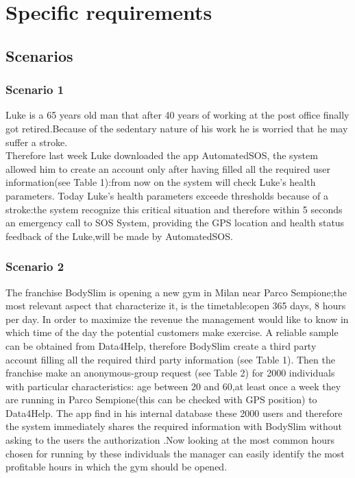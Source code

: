 \section{Specific requirements}
\label{sec:specreq}
\subsection{Scenarios}
\subsubsection{Scenario 1}
Luke is a 65 years old man that after 40 years of  working at the post office finally got retired.Because of the sedentary nature of his work he is worried that he may suffer a stroke.\\ Therefore last week Luke downloaded the app AutomatedSOS, the system allowed him to create an account only after having filled all the required user information(see Table 1):from now on the system will check Luke's health parameters. Today Luke's health parameters exceede thresholds because of a stroke:the system recognize this critical situation and therefore within 5 seconds an emergency call to SOS System, providing the GPS location and health status feedback of the Luke,will be made by AutomatedSOS.

\subsubsection{Scenario 2}
The franchise BodySlim is opening a new gym in Milan near Parco Sempione;the most relevant aspect that characterize it, is the timetable:open 365 days, 8 hours per day. In order to maximize the revenue the management would like to know in which time of the day the potential customers make exercise. A reliable sample can be obtained from Data4Help, therefore BodySlim create a third party account filling all the required third party information (see Table 1). Then the franchise make an anonymous-group request (see Table 2) for 2000 individuals with particular characteristics: age between 20 and 60,at least once a week they are running in Parco Sempione(this can be checked with GPS position) to Data4Help. The app find in his internal database these 2000 users and therefore the system immediately shares the required information with BodySlim without asking to the users the authorization .Now looking at the most common hours chosen for running by these individuals the manager can easily identify the most profitable hours in which the gym should be opened. 

